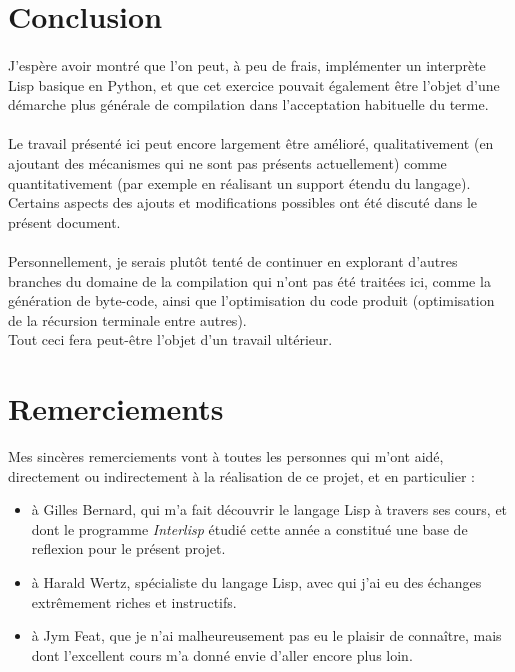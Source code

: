 \documentclass{article}
\begin{document}
\section{Conclusion}

\paragraph{}
J'espère avoir montré que l'on peut, à peu de frais, implémenter un interprète Lisp basique en Python,
et que cet exercice pouvait également être l'objet d'une démarche plus générale de compilation dans
l'acceptation habituelle du terme.
\paragraph{}
Le travail présenté ici peut encore largement être amélioré, 
qualitativement (en ajoutant des mécanismes qui ne sont pas présents actuellement)
comme quantitativement (par exemple en réalisant un support étendu du langage).
Certains aspects des ajouts et modifications possibles ont été discuté dans le présent document.
\paragraph{}
Personnellement, je serais plutôt tenté de continuer en explorant d'autres branches du domaine de la compilation 
qui n'ont pas été traitées ici, comme la génération de byte-code, ainsi que l'optimisation
du code produit (optimisation de la récursion terminale entre autres).
\\
Tout ceci fera peut-être l'objet d'un travail ultérieur.

\section{Remerciements}
% 

Mes sincères remerciements vont à toutes les personnes qui m'ont aidé, directement ou indirectement à la
réalisation de ce projet, et en particulier :

\begin{itemize}
  \item à Gilles Bernard, qui m'a fait découvrir le langage Lisp à travers ses cours, et dont le programme \emph{Interlisp}
  étudié cette année a constitué une base de reflexion pour le présent projet.
  \item à Harald Wertz, spécialiste du langage Lisp, avec qui j'ai eu des échanges extrêmement riches et instructifs.
  \item à Jym Feat, que je n'ai malheureusement pas eu le plaisir de connaître, mais dont l'excellent
cours m'a donné envie d'aller encore plus loin.
\end{itemize}



\end{document}
